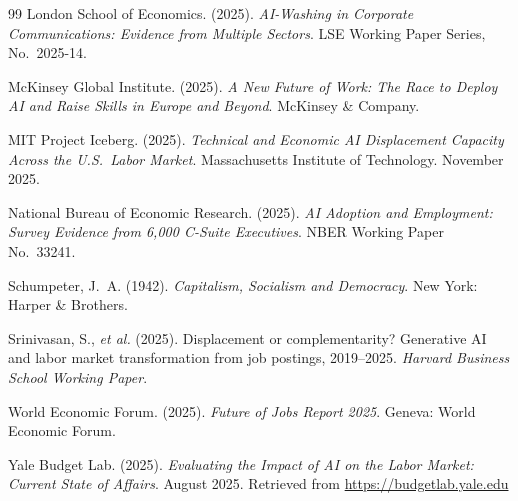 \documentclass[12pt, a4paper]{article}
\begin{document}
\begin{thebibliography}{99}
London School of Economics. (2025).
\newblock \emph{AI-Washing in Corporate Communications: Evidence from Multiple Sectors}.
\newblock LSE Working Paper Series, No.\ 2025-14.

McKinsey Global Institute. (2025).
\newblock \emph{A New Future of Work: The Race to Deploy AI and Raise Skills in Europe and
Beyond}. McKinsey \& Company.

MIT Project Iceberg. (2025).
\newblock \emph{Technical and Economic AI Displacement Capacity Across the U.S.\ Labor Market}.
\newblock Massachusetts Institute of Technology. November 2025.

National Bureau of Economic Research. (2025).
\newblock \emph{AI Adoption and Employment: Survey Evidence from 6,000 C-Suite Executives}.
\newblock NBER Working Paper No.\ 33241.

Schumpeter, J.~A. (1942).
\newblock \emph{Capitalism, Socialism and Democracy}.
\newblock New York: Harper \& Brothers.

Srinivasan, S., \textit{et al.} (2025).
\newblock Displacement or complementarity? Generative AI and labor market transformation
from job postings, 2019--2025.
\newblock \emph{Harvard Business School Working Paper}.

World Economic Forum. (2025).
\newblock \emph{Future of Jobs Report 2025}.
\newblock Geneva: World Economic Forum.

Yale Budget Lab. (2025).
\newblock \emph{Evaluating the Impact of AI on the Labor Market: Current State of Affairs}.
\newblock August 2025. Retrieved from \url{https://budgetlab.yale.edu}

\end{thebibliography}
\end{document}

